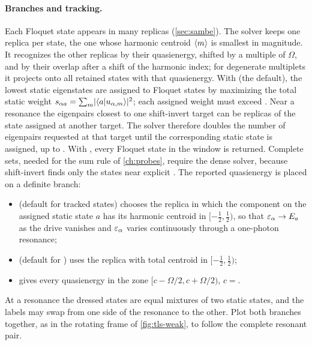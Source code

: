 \paragraph{Branches and tracking.}
Each Floquet state appears in many replicas (\cref{sec:sambe}). The solver keeps one replica
per state, the one whose harmonic centroid $\langle m\rangle$ is smallest in magnitude. It
recognizes the other replicas by their quasienergy, shifted by a multiple of $\Omega$, and
by their overlap after a shift of the harmonic index; for degenerate multiplets it projects
onto all retained states with that quasienergy. With  (the default), the
lowest  static eigenstates are assigned to Floquet states by maximizing the
total static weight $s_{\alpha a}=\sum_m\lvert \langle a\vert u_{\alpha,m}\rangle\rvert^2$; each assigned weight must
exceed . Near a resonance the eigenpairs closest to one shift-invert
target can be replicas of the state assigned at another target. The solver therefore doubles
the number of eigenpairs requested at that target until the corresponding static state is assigned, up to
. With
, every Floquet state in the window is returned. Complete sets, needed
for the sum rule of \cref{ch:probes}, require the dense solver, because shift-invert finds
only the states near explicit . The reported quasienergy is placed on a
definite branch:
\begin{itemize}
\item {} (default for tracked states) chooses the replica in which the
component on the assigned static state $a$ has its harmonic centroid in $[-\tfrac12,\tfrac12)$,
so that $\varepsilon_\alpha\to E_a$ as the drive vanishes and $\varepsilon_\alpha$ varies continuously
through a one-photon resonance;
\item {} (default for ) uses the replica with
total centroid in $[-\tfrac12,\tfrac12)$;
\item {} gives every quasienergy in the zone $[c-\Omega/2,c+\Omega/2)$,
$c=$.
\end{itemize}

\begin{caution}
At a resonance the dressed states are equal mixtures of two static states, and the
labels may swap from one side of the resonance to the other. Plot both branches together,
as in the rotating frame of \cref{fig:tls-weak}, to follow the complete resonant pair.
\end{caution}

